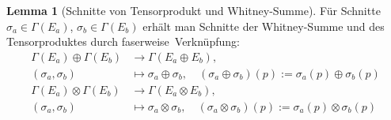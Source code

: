 \documentclass[a4paper]{scrreprt}
\numberwithin{equation}{chapter}
\theoremstyle{definition}
\newtheorem{lemma}[defn]{Lemma}
\begin{document}
		\begin{lemma}[Schnitte von Tensorprodukt und Whitney-Summe]
			Für Schnitte $\sigma_a\in\Gamma(E_a)$, $\sigma_b\in\Gamma(E_b)$ erhält man Schnitte der Whitney-Summe und des Tensorproduktes durch \glqq faserweise\grqq\ Verknüpfung:
			\begin{align*}
				\Gamma(E_a)\oplus\Gamma(E_b)&\rightarrow\Gamma(E_a\oplus E_b),\\
				(\sigma_a,\sigma_b)&\mapsto \sigma_a\oplus\sigma_b,\quad (\sigma_a\oplus\sigma_b)(p):=\sigma_a(p)\oplus\sigma_b(p)\\
				\Gamma(E_a)\otimes\Gamma(E_b)&\rightarrow\Gamma(E_a\otimes E_b),\\
				(\sigma_a,\sigma_b)&\mapsto \sigma_a\otimes\sigma_b,\quad (\sigma_a\otimes\sigma_b)(p):=\sigma_a(p)\otimes\sigma_b(p)
			\end{align*}
		\end{lemma}
		
\end{document}
